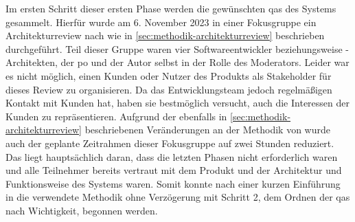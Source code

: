 Im ersten Schritt dieser ersten Phase werden die gewünschten \glspl{qa} des Systems gesammelt.
Hierfür wurde am 6. November 2023 in einer Fokusgruppe ein Architekturreview nach  wie in \cref{sec:methodik-architekturreview} beschrieben durchgeführt.
Teil dieser Gruppe waren vier Softwareentwickler beziehungsweise -Architekten, der \acrlong{po} und der Autor selbst in der Rolle des Moderators.
Leider war es nicht möglich, einen Kunden oder Nutzer des Produkts als Stakeholder für dieses Review zu organisieren.
Da das Entwicklungsteam jedoch regelmäßigen Kontakt mit Kunden hat, haben sie bestmöglich versucht, auch die Interessen der Kunden zu repräsentieren.
Aufgrund der ebenfalls in \cref{sec:methodik-architekturreview} beschriebenen Veränderungen an der Methodik von  wurde auch der geplante Zeitrahmen dieser Fokusgruppe auf zwei Stunden reduziert. Das liegt hauptsächlich daran, dass die letzten Phasen nicht erforderlich waren und alle Teilnehmer bereits vertraut mit dem Produkt und der Architektur und Funktionsweise des Systems waren.
Somit konnte nach einer kurzen Einführung in die verwendete Methodik ohne Verzögerung mit Schritt 2, dem Ordnen der \glspl{qa} nach Wichtigkeit, begonnen werden.


